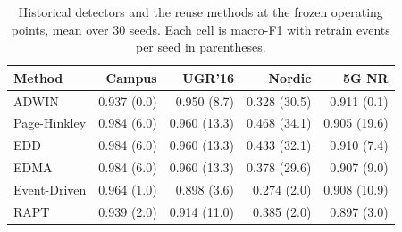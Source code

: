 \begin{table}[t]
\caption{Historical detectors and the reuse methods at the frozen operating points, mean over 30 seeds. Each cell is macro-F1 with retrain events per seed in parentheses.}
\label{tab:detectors}
\centering
\footnotesize
\begin{tabular}{@{}lrrrr@{}}
\toprule
\textbf{Method} & \textbf{Campus} & \textbf{UGR'16} & \textbf{Nordic} & \textbf{5G NR}\\
\midrule
ADWIN & 0.937 (0.0) & 0.950 (8.7) & 0.328 (30.5) & 0.911 (0.1) \\
Page-Hinkley & 0.984 (6.0) & 0.960 (13.3) & 0.468 (34.1) & 0.905 (19.6) \\
EDD & 0.984 (6.0) & 0.960 (13.3) & 0.433 (32.1) & 0.910 (7.4) \\
EDMA & 0.984 (6.0) & 0.960 (13.3) & 0.378 (29.6) & 0.907 (9.0) \\
Event-Driven & 0.964 (1.0) & 0.898 (3.6) & 0.274 (2.0) & 0.908 (10.9) \\
RAPT & 0.939 (2.0) & 0.914 (11.0) & 0.385 (2.0) & 0.897 (3.0) \\
\bottomrule
\end{tabular}
\end{table}
